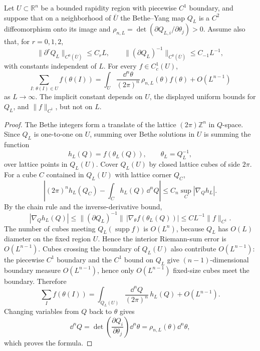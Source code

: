 \begin{proposition}
\label{prop:gaudin-state-counting-measure}
Let \(U\subset\mathbb R^n\) be a bounded rapidity region with piecewise
\(C^1\) boundary, and suppose that on a neighborhood of \(\overline U\) the
Bethe--Yang map \(Q_L\) is a \(C^2\) diffeomorphism onto its image and
\(\rho_{n,L}=\det(\partial Q_{L,i}/\partial\theta_j)>0\).  Assume also that,
for \(r=0,1,2\),
\[
  \|\partial^r Q_L\|_{C^0(\overline U)}\le C_rL,
  \qquad
  \|(\partial Q_L)^{-1}\|_{C^0(\overline U)}\le C_{-1}L^{-1},
\]
with constants independent of \(L\).  For every \(f\in C^1_c(U)\),
\[
  \sum_{I:\,\theta(I)\in U}f(\theta(I))
  =
  \int_U
  \frac{\dd^n\theta}{(2\pi)^n}\,
  \rho_{n,L}(\theta)f(\theta)
  +
  O(L^{n-1})
\]
as \(L\to\infty\).  The implicit constant depends on \(U\), the displayed
uniform bounds for \(Q_L\), and \(\|f\|_{C^1}\), but not on \(L\).
\end{proposition}

\begin{proof}
The Bethe integers form a translate of the lattice \((2\pi)\mathbb Z^n\) in
\(Q\)-space.  Since \(Q_L\) is one-to-one on \(U\), summing over Bethe
solutions in \(U\) is summing the function
\[
  h_L(Q)=f(\theta_L(Q)),
  \qquad
  \theta_L=Q_L^{-1},
\]
over lattice points in \(Q_L(U)\).  Cover \(Q_L(U)\) by closed lattice cubes
of side \(2\pi\).  For a cube \(C\) contained in \(Q_L(U)\) with lattice
corner \(Q_C\),
\[
  \left|
    (2\pi)^n h_L(Q_C)-\int_C h_L(Q)\,\dd^nQ
  \right|
  \le
  C_n\sup_C|\nabla_Qh_L|.
\]
By the chain rule and the inverse-derivative bound,
\[
  |\nabla_Q h_L(Q)|
  \le
  \|(\partial Q_L)^{-1}\|\,|\nabla_\theta f(\theta_L(Q))|
  \le
  C L^{-1}\|f\|_{C^1}.
\]
The number of cubes meeting \(Q_L(\operatorname{supp}f)\) is \(O(L^n)\),
because \(Q_L\) has \(O(L)\) diameter on the fixed region \(U\).  Hence the
interior Riemann-sum error is \(O(L^{n-1})\).  Cubes crossing the boundary of
\(Q_L(U)\) also contribute \(O(L^{n-1})\): the piecewise \(C^1\) boundary and
the \(C^1\) bound on \(Q_L\) give \((n-1)\)-dimensional boundary measure
\(O(L^{n-1})\), hence only \(O(L^{n-1})\) fixed-size cubes meet the boundary.
Therefore
\[
  \sum_I f(\theta(I))
  =
  \int_{Q_L(U)}
  \frac{\dd^nQ}{(2\pi)^n}\,
  h_L(Q)
  +
  O(L^{n-1}).
\]
Changing variables from \(Q\) back to \(\theta\) gives
\[
  \dd^nQ=\det\left(\frac{\partial Q_i}{\partial\theta_j}\right)\dd^n\theta
  =
  \rho_{n,L}(\theta)\dd^n\theta ,
\]
which proves the formula.
\end{proof}

